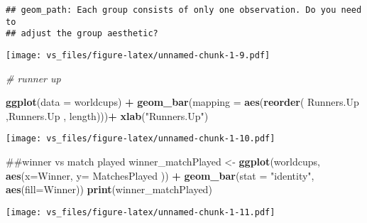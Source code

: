 \documentclass[]{article}
\newenvironment{Shaded}{\begin{snugshade}}{\end{snugshade}}
\newcommand{\KeywordTok}[1]{\textcolor[rgb]{0.13,0.29,0.53}{\textbf{#1}}}
\newcommand{\DataTypeTok}[1]{\textcolor[rgb]{0.13,0.29,0.53}{#1}}
\newcommand{\FloatTok}[1]{\textcolor[rgb]{0.00,0.00,0.81}{#1}}
\newcommand{\StringTok}[1]{\textcolor[rgb]{0.31,0.60,0.02}{#1}}
\newcommand{\CommentTok}[1]{\textcolor[rgb]{0.56,0.35,0.01}{\textit{#1}}}
\newcommand{\OperatorTok}[1]{\textcolor[rgb]{0.81,0.36,0.00}{\textbf{#1}}}
\newcommand{\NormalTok}[1]{#1}
\begin{document}
\begin{Shaded}
\end{Shaded}

\begin{verbatim}
## geom_path: Each group consists of only one observation. Do you need to
## adjust the group aesthetic?
\end{verbatim}

\texttt{[image: vs\_files/figure-latex/unnamed-chunk-1-9.pdf]}

\begin{Shaded}
\begin{Highlighting}[]
\CommentTok{# runner up}

\KeywordTok{ggplot}\NormalTok{(}\DataTypeTok{data =}\NormalTok{ worldcups) }\OperatorTok{+}\StringTok{ }\KeywordTok{geom_bar}\NormalTok{(}\DataTypeTok{mapping =} \KeywordTok{aes}\NormalTok{(}\KeywordTok{reorder}\NormalTok{( Runners.Up ,Runners.Up , length)))}\OperatorTok{+}\StringTok{ }\KeywordTok{xlab}\NormalTok{(}\StringTok{"Runners.Up"}\NormalTok{)}
\end{Highlighting}
\end{Shaded}

\texttt{[image: vs\_files/figure-latex/unnamed-chunk-1-10.pdf]}

\begin{Shaded}
\begin{Highlighting}[]
\NormalTok{##winner vs match played}
\NormalTok{winner_matchPlayed <-}\StringTok{ }\KeywordTok{ggplot}\NormalTok{(worldcups, }\KeywordTok{aes}\NormalTok{(}\DataTypeTok{x=}\NormalTok{Winner, }\DataTypeTok{y=}\NormalTok{ MatchesPlayed )) }\OperatorTok{+}\StringTok{ }\KeywordTok{geom_bar}\NormalTok{(}\DataTypeTok{stat =} \StringTok{"identity"}\NormalTok{, }\KeywordTok{aes}\NormalTok{(}\DataTypeTok{fill=}\NormalTok{Winner))}
\KeywordTok{print}\NormalTok{(winner_matchPlayed)}
\end{Highlighting}
\end{Shaded}

\texttt{[image: vs\_files/figure-latex/unnamed-chunk-1-11.pdf]}
\end{document}
